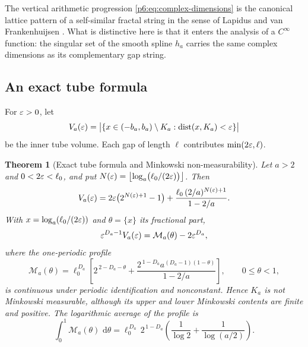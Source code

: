\documentclass[11pt,oneside]{article}
\numberwithin{equation}{section}
\newtheorem{theorem}{Theorem}[section]
\theoremstyle{definition}
\theoremstyle{remark}
\newcommand{\dd}{\,\mathrm d}
\begin{document}
The vertical arithmetic progression \eqref{p6:eq:complex-dimensions} is the
canonical lattice pattern of a self-similar fractal string in the sense of
Lapidus and van Frankenhuijsen \cite{p6:lapidus-vf}.  What is distinctive here
is that it enters the analysis of a $C^\infty$ function: the singular set of
the smooth spline $h_a$ carries the same complex dimensions as its
complementary gap string.

\subsection{An exact tube formula}

For $\varepsilon>0$, let
\begin{equation}\label{p6:eq:tube-def}
 V_a(\varepsilon)=
 \bigl|\{x\in(-b_a,b_a)\setminus K_a:\operatorname{dist}(x,K_a)<\varepsilon\}\bigr|
\end{equation}
be the inner tube volume.  Each gap of length $\ell$ contributes
$\min(2\varepsilon,\ell)$.

\begin{theorem}[Exact tube formula and Minkowski non-measurability]
\label{p6:thm:tube-formula}
Let $a>2$ and $0<2\varepsilon<\ell_0$, and put
$N(\varepsilon)=\bigl\lfloor\log_a\bigl(\ell_0/(2\varepsilon)\bigr)\bigr\rfloor$.  Then
\begin{equation}\label{p6:eq:exact-tube}
 V_a(\varepsilon)=2\varepsilon\bigl(2^{N(\varepsilon)+1}-1\bigr)
 +\frac{\ell_0\,(2/a)^{N(\varepsilon)+1}}{1-2/a}.
\end{equation}
With $x=\log_a(\ell_0/(2\varepsilon))$ and $\theta=\{x\}$ its fractional part,
\begin{equation}\label{p6:eq:tube-normalized}
 \varepsilon^{D_a-1}V_a(\varepsilon)
 =\mathcal M_a(\theta)-2\varepsilon^{D_a},
\end{equation}
where the one-periodic profile
\begin{equation}\label{p6:eq:minkowski-profile}
 \mathcal M_a(\theta)=\ell_0^{\,D_a}
 \left[
 2^{\,2-D_a-\theta}
 +\frac{2^{\,1-D_a}a^{(D_a-1)(1-\theta)}}{1-2/a}
 \right],
 \qquad0\le\theta<1,
\end{equation}
is continuous under periodic identification and nonconstant.  Hence $K_a$ is
not Minkowski measurable, although its upper and lower Minkowski contents are
finite and positive.  The logarithmic average of the profile is
\begin{equation}\label{p6:eq:average-minkowski}
 \int_0^1\mathcal M_a(\theta)\,\dd\theta
 =\ell_0^{\,D_a}\,2^{\,1-D_a}
 \left(\frac1{\log2}+\frac1{\log(a/2)}\right).
\end{equation}
\end{theorem}
\end{document}
